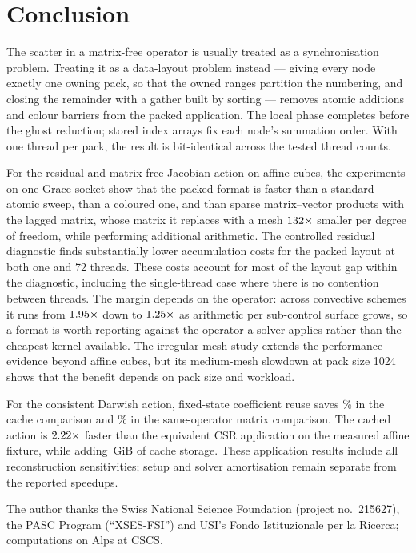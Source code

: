 \documentclass[sigconf,nonacm]{acmart}
\begin{document}
\section{Conclusion}
\label{sec:conclusion}

The scatter in a matrix-free operator is usually treated as a synchronisation problem. Treating
it as a data-layout problem instead --- giving every node exactly one owning pack, so that the
owned ranges partition the numbering, and closing the remainder with a gather built by sorting
--- removes atomic additions and colour barriers from the packed application. The local phase
completes before the ghost reduction; stored index arrays fix each node's summation order.
With one thread per pack, the result is bit-identical across the tested thread counts.

For the residual and matrix-free Jacobian action on affine cubes, the
experiments on one Grace socket show that the packed format is faster than
a standard atomic sweep, than a
coloured one, and than sparse matrix--vector products with the lagged matrix, whose matrix it
replaces with a mesh $132\times$ smaller per degree of freedom, while performing additional arithmetic. The controlled residual diagnostic finds
substantially lower accumulation costs for the packed layout at both one and 72 threads.
These costs account for most of the layout gap within the diagnostic, including the
single-thread case where there is no contention between threads. The margin depends on the
operator: across convective schemes it runs from $1.95\times$ down to
$1.25\times$ as arithmetic per sub-control surface grows, so a format is worth
reporting against the operator a solver applies rather than the cheapest kernel available.
The irregular-mesh study extends the performance evidence beyond affine cubes,
but its medium-mesh slowdown at pack size 1024 shows that the benefit depends
on pack size and workload.

For the consistent Darwish action, fixed-state coefficient reuse saves
\dcTimeReduction\% in the cache comparison and \cmTimeReduction\% in the
same-operator matrix comparison. The cached action is $2.22\times$
faster than the equivalent CSR application on the measured affine fixture,
while adding \cmCacheGiB{}\,GiB of cache storage. These application results
include all reconstruction sensitivities; setup and solver amortisation remain
separate from the reported speedups.

\begin{acks}
The author thanks the Swiss National Science Foundation (project no.~215627), the PASC Program
(``XSES-FSI'') and USI's Fondo Istituzionale per la Ricerca; computations on Alps at CSCS.
\end{acks}



\end{document}
